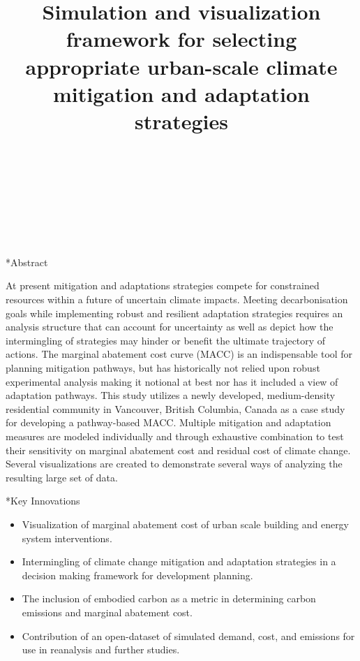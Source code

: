 \documentclass[twocolumn, a4paper,10pt]{article}
\title{%
Simulation and visualization framework for selecting appropriate urban-scale climate mitigation and adaptation strategies} 																																%
\author{																																														%
\\ 																				%
\\ 																																                                                            	%
\\ 																																                                                                %
\\ 			 			  	                                                    %
\\ 														                    	%
\phantom{Line 9}} 																																								            	%
\date{\vspace{-0.5cm}}	%
\makeatletter
\renewcommand\section{\@startsection{section}{1}{\z@}{3pt}{3pt}{\normalfont\large\bfseries}}
\makeatother
\begin{document}
\maketitle

\section*{Abstract}	%
\addtocounter{section}{1}
At present mitigation and adaptations strategies compete for constrained resources within a future of uncertain climate impacts. Meeting decarbonisation goals while implementing robust and resilient adaptation strategies requires an analysis structure that can account for uncertainty as well as depict how the intermingling of strategies may hinder or benefit the ultimate trajectory of actions. The marginal abatement cost curve (MACC) is an indispensable tool for planning mitigation pathways, but has historically not relied upon robust experimental analysis making it notional at best nor has it included a view of adaptation pathways. This study utilizes a newly developed, medium-density residential community in Vancouver, British Columbia, Canada as a case study for developing a pathway-based MACC. Multiple mitigation and adaptation measures are modeled individually and through exhaustive combination to test their sensitivity on marginal abatement cost and residual cost of climate change. Several visualizations are created to demonstrate several ways of analyzing the resulting large set of data.   

\section*{Key Innovations}
\begin{itemize}
\item Visualization of marginal abatement cost of urban scale building and energy system interventions.
\item Intermingling of climate change mitigation and adaptation strategies in a decision making framework for development planning.
\item The inclusion of embodied carbon as a metric in determining carbon emissions and marginal abatement cost.
\item Contribution of an open-dataset of simulated demand, cost, and emissions for use in reanalysis and further studies.
\end{itemize}
\end{document}
